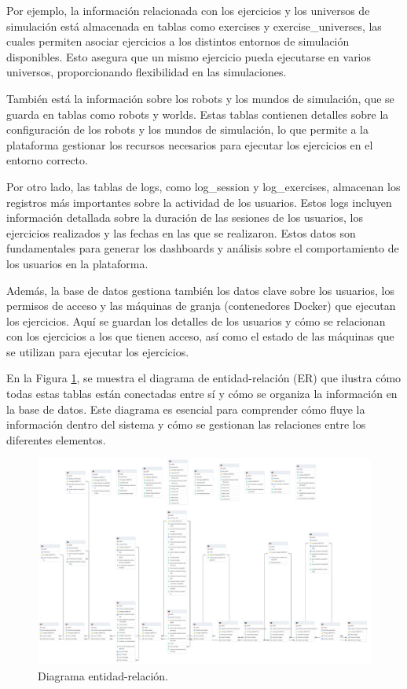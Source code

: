 \documentclass[a4paper, 12pt]{book}
\begin{document}
Por ejemplo, la información relacionada con los ejercicios y los universos de simulación está almacenada en tablas como exercises y exercise\_universes, las cuales permiten asociar ejercicios a los distintos entornos de simulación disponibles. Esto asegura que un mismo ejercicio pueda ejecutarse en varios universos, proporcionando flexibilidad en las simulaciones.

También está la información sobre los robots y los mundos de simulación, que se guarda en tablas como robots y worlds. Estas tablas contienen detalles sobre la configuración de los robots y los mundos de simulación, lo que permite a la plataforma gestionar los recursos necesarios para ejecutar los ejercicios en el entorno correcto.

Por otro lado, las tablas de logs, como log\_session y log\_exercises, almacenan los registros más importantes sobre la actividad de los usuarios. Estos logs incluyen información detallada sobre la duración de las sesiones de los usuarios, los ejercicios realizados y las fechas en las que se realizaron. Estos datos son fundamentales para generar los dashboards y análisis sobre el comportamiento de los usuarios en la plataforma.

Además, la base de datos gestiona también los datos clave sobre los usuarios, los permisos de acceso y las máquinas de granja (contenedores Docker) que ejecutan los ejercicios. Aquí se guardan los detalles de los usuarios y cómo se relacionan con los ejercicios a los que tienen acceso, así como el estado de las máquinas que se utilizan para ejecutar los ejercicios.

En la Figura \ref{fig:ER}, se muestra el diagrama de entidad-relación (ER) que ilustra cómo todas estas tablas están conectadas entre sí y cómo se organiza la información en la base de datos. Este diagrama es esencial para comprender cómo fluye la información dentro del sistema y cómo se gestionan las relaciones entre los diferentes elementos.

\begin{figure}[H]
    \centering
    \includegraphics[angle=90, width=\textwidth, height=\textheight, keepaspectratio]{img/ER.png}
    \caption{Diagrama entidad-relación.}
    \label{fig:ER}
\end{figure}
\end{document}
